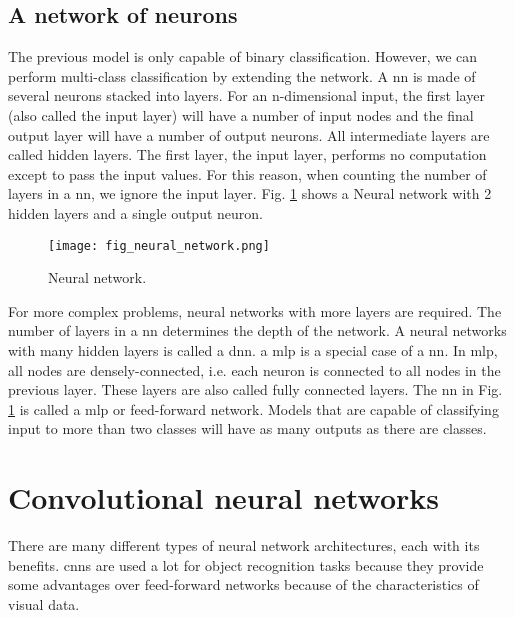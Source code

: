 \subsection{A network of neurons}
The previous model is only capable of binary classification. However, we can perform multi-class classification by extending the network. A \acrfull{nn} is made of several neurons stacked into layers. For an n-dimensional input, the first layer (also called the input layer) will have a number of input nodes and the final output layer will have a number of output neurons. All intermediate layers are called hidden layers. The first layer, the input layer, performs no computation except to pass the input values. For this reason, when counting the number of layers in a \acrshort{nn}, we ignore the input layer. Fig. \ref{fig:neural_network} shows a Neural network with 2 hidden layers and a single output neuron. 
\begin{figure}[ht]
    \begin{center}
    \texttt{[image: fig\_neural\_network.png]}
    \caption{Neural network.}
    \label{fig:neural_network}
    \end{center}
\end{figure}

For more complex problems, neural networks with more layers are required. The number of layers in a \acrshort{nn} determines the depth of the network. A neural networks with many hidden layers is called a \acrfull{dnn}. a \acrfull{mlp} is a special case of a \acrshort{nn}. In \acrshort{mlp}, all nodes are densely-connected, i.e. each neuron is connected to all nodes in the previous layer. These layers are also called fully connected layers. The \acrshort{nn} in Fig. \ref{fig:neural_network} is called a \acrshort{mlp} or feed-forward network. Models that are capable of classifying input to more than two classes will have as many outputs as there are classes.

\section{Convolutional neural networks}
There are many different types of neural network architectures, each with its benefits. \acrfull{cnn}s are used a lot for object recognition tasks because they provide some advantages over feed-forward networks because of the characteristics of visual data.

